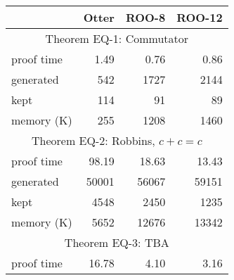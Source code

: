 \begin{table}[htbp] \centering
\begin{tabular}{lrrr}
            &  Otter     &    ROO-8       &    ROO-12              \\
\hline
       \multicolumn{4}{c}{Theorem EQ-1: Commutator} \\
proof time  &  1.49      &    0.76        &    0.86        	   \\
generated   &  542       &    1727        &    2144        	   \\
kept        &  114       &    91          &    89          	   \\
memory (K)  &  255       &    1208        &    1460        	   \\
\hline
      \multicolumn{4}{c}{Theorem EQ-2: Robbins, $c+c=c$} \\
proof time  &  98.19     &    18.63       &    13.43       	   \\
generated   &  50001     &    56067       &    59151       	   \\
kept        &  4548      &    2450        &    1235        	   \\
memory (K)  &  5652      &    12676       &    13342       	   \\
\hline
     \multicolumn{4}{c}{Theorem EQ-3: TBA} \\
proof time  &  16.78     &    4.10        &    3.16        	   \\

\end{tabular}
\end{table}

